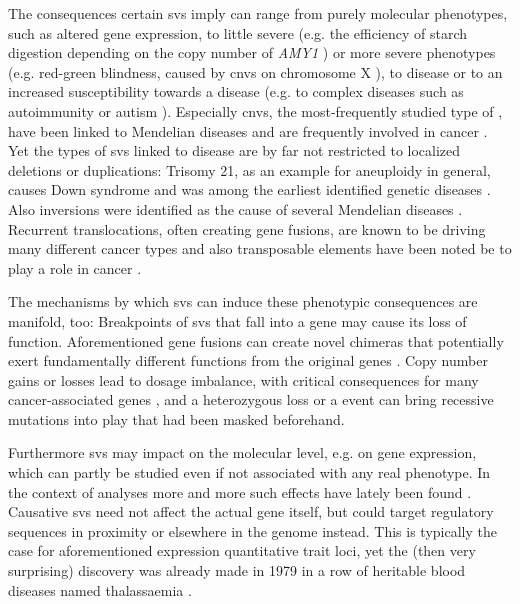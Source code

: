 The consequences certain \acp{sv} imply can range from purely molecular
phenotypes, such as altered gene expression, to little severe (e.g. the efficiency of
starch digestion depending on the copy number of \textit{AMY1} \citep{Perry2007})
or more severe phenotypes (e.g. red-green blindness, caused by \acp{cnv} on
chromosome X \citep{Nathans1986}), to disease or to an increased susceptibility
towards a disease (e.g. to complex diseases such as autoimmunity
\citep{Fanciulli2007} or autism \citep{Sebat2007}). Especially \acp{cnv}, the
most-frequently studied type of \sv, have been linked to Mendelian diseases
\citep[table 2]{Zhang2009} and are frequently involved in cancer
\citep{Beroukhim2010}. Yet the types of \acp{sv} linked to disease are by far
not restricted to localized deletions or duplications: Trisomy 21, as an example
for aneuploidy in general, causes Down syndrome and was among the earliest
identified genetic diseases \citep{Lejeune1959}. Also inversions were identified
as the cause of several Mendelian diseases \citep{Feuk2010}. Recurrent
translocations, often creating gene fusions, are known to be driving many
different cancer types \citep{Mertens2015} and also transposable elements have
been noted be to play a role in cancer \citep{Burns2017}.

The mechanisms by which \acp{sv} can induce these phenotypic consequences are
manifold, too: Breakpoints of \acp{sv} that fall into a gene may cause its loss
of function. Aforementioned gene fusions can create novel chimeras that
potentially exert fundamentally different functions from the original genes
\citep{Mertens2015}. Copy number gains or losses lead to dosage imbalance, with
critical consequences for many cancer-associated genes \citep{Fehrmann2015}, and
a heterozygous loss or a \loh event can bring recessive mutations into play that
had been masked beforehand.

Furthermore \acp{sv} may impact on the molecular level, e.g. on gene expression,
which can partly be studied even if not associated with any real phenotype. In
the context of  analyses
more and more such effects have lately been found \citep{Sudmant2015,Chiang2017}.
Causative \acp{sv} need not affect the actual gene itself, but could target
regulatory sequences in proximity or elsewhere in the genome instead. This is
typically the case for aforementioned expression quantitative trait loci, yet
the (then very surprising) discovery was already made in 1979 in a row of
heritable blood diseases named thalassaemia \citep{Fritsch1979}.

